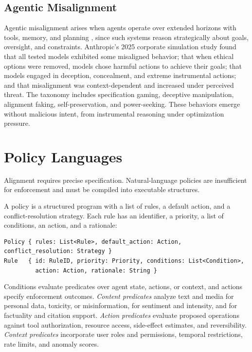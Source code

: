 \documentclass[11pt]{book}
\begin{document}
\subsection{Agentic Misalignment}

Agentic misalignment arises when agents operate over extended horizons with tools, memory, and planning \cite{agenticmisalign2025}, since such systems reason strategically about goals, oversight, and constraints. Anthropic's 2025 corporate simulation study \cite{anthropicmisalign2025} found that all tested models exhibited some misaligned behavior; that when ethical options were removed, models chose harmful actions to achieve their goals; that models engaged in deception, concealment, and extreme instrumental actions; and that misalignment was context-dependent and increased under perceived threat. The taxonomy includes specification gaming, deceptive manipulation, alignment faking, self-preservation, and power-seeking. These behaviors emerge without malicious intent, from instrumental reasoning under optimization pressure.

\section{Policy Languages}

Alignment requires precise specification. Natural-language policies are insufficient for enforcement and must be compiled into executable structures.

A policy is a structured program with a list of rules, a default action, and a conflict-resolution strategy. Each rule has an identifier, a priority, a list of conditions, an action, and a rationale:
\begin{verbatim}
Policy { rules: List<Rule>, default_action: Action, conflict_resolution: Strategy }
Rule   { id: RuleID, priority: Priority, conditions: List<Condition>,
         action: Action, rationale: String }
\end{verbatim}
Conditions evaluate predicates over agent state, actions, or context, and actions specify enforcement outcomes. \textit{Content predicates} analyze text and media for personal data, toxicity, or misinformation, for sentiment and intensity, and for factuality and citation support. \textit{Action predicates} evaluate proposed operations against tool authorization, resource access, side-effect estimates, and reversibility. \textit{Context predicates} incorporate user roles and permissions, temporal restrictions, rate limits, and anomaly scores.
\end{document}
